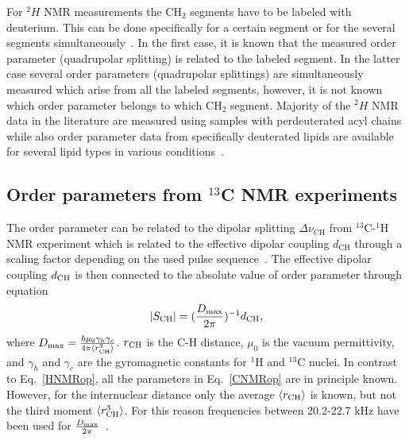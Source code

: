 \documentclass[aps,prl,superscriptaddress,twocolumn]{revtex4}
\begin{document}
For $^2H$ NMR measurements the CH$_2$ segments have to be labeled with deuterium.
This can be done specifically for a certain segment or for the several segments
simultaneously~\cite{davis83,bloom91,leftin11}. In the first case, it is known that the measured
order parameter (quadrupolar splitting) is related to the labeled segment.
In the latter case several order parameters (quadrupolar splittings) are simultaneously
measured which arise from all the labeled segments, however, it is not known 
which order parameter belongs to which CH$_2$ segment. Majority of the $^2H$ NMR data
in the literature are measured using samples with perdeuterated acyl chains \cite{leftin11,marsh13}
while also order parameter data from specifically deuterated lipids are available for 
several lipid types in various conditions~\cite{seelig74,seelig75,seelig77,seelig78,gally81,akutsu81,altenbach84,scherer89,kuchinka89,roux90,ulrich94,douliez95}.

\subsection{Order parameters from $^{13}$C NMR experiments}\label{CopSECTION}

The order parameter can be related to the dipolar splitting $\Delta \nu_\mathrm{CH}$ 
from $^{13}$C-$^1$H NMR experiment which is related to the effective dipolar 
coupling $d_\mathrm{CH}$ through a scaling factor depending on the used pulse 
sequence~\cite{hong95a,gross97,dvinskikh05a,ferreira13}. The effective dipolar 
coupling $d_{{\rm CH}}$ is then connected to the absolute value of order parameter through equation
\begin{equation}\label{CNMRop}
|S_{{\rm CH}}|=(\frac{D_{{\rm max}}}{2\pi})^{-1}d_\mathrm{CH},
\end{equation}
where $D_{{\rm max}} = \frac{\hbar \mu_0 \gamma_h \gamma_c}{4\pi\langle r_\mathrm{CH}^3 \rangle}$. 
$r_{{\rm CH}}$ is the C-H distance, $\mu_0$ is the vacuum permittivity, and $\gamma_h$ and $\gamma_c$ are 
the gyromagnetic constants for $^1$H and $^{13}$C nuclei. In contrast to Eq.~\ref{HNMRop}, all the parameters in 
Eq.~\ref{CNMRop} are in principle known. However, for the internuclear distance only the average $\langle r_{{\rm CH}} \rangle$ 
is known, but not the third moment $\langle r^3_{{\rm CH}} \rangle$. For this reason frequencies between 20.2-22.7 kHz have been used for
$\frac{D_{{\rm max}}}{2\pi}$~\cite{hong95a,gross97,dvinskikh05a,becker05,ferreira13,ferreira15}.
\end{document}

